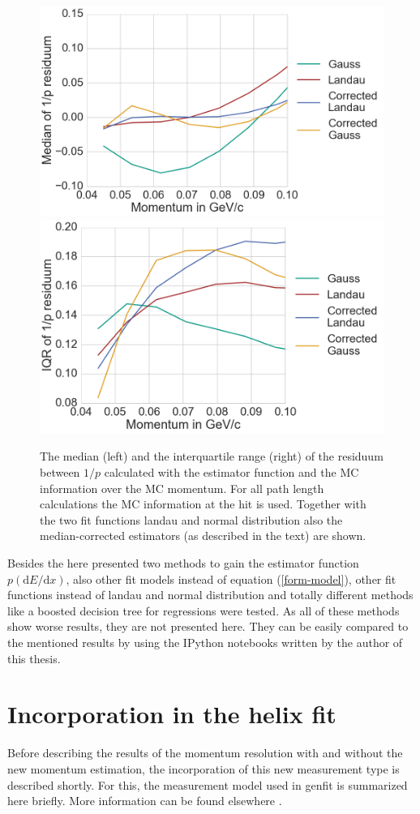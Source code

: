 \begin{figure}
  \centering
   \includegraphics[width=0.47\linewidth]{figures/vxd/divPMedian.png}
   \includegraphics[width=0.47\linewidth]{figures/vxd/divPIQR.png}
  \caption[Median and IQR of $1/p$.]{The median (left) and the interquartile range (right) of the residuum between $1/p$ calculated with the estimator function and the MC information over the MC momentum. For all path length calculations the MC information at the hit is used. Together with the two fit functions landau and normal distribution also the median-corrected estimators (as described in the text) are shown.}
  \label{fig-divp-residuum}
\end{figure}


Besides the here presented two methods to gain the estimator function $p(\mathrm dE/\mathrm dx)$, also other fit models instead of equation (\ref{form-model}), other fit functions instead of landau and normal distribution and totally different methods like a boosted decision tree for regressions were tested. As all of these methods show worse results, they are not presented here. They can be easily compared to the mentioned results by using the IPython notebooks written by the author of this thesis.

\section{Incorporation in the helix fit}

Before describing the results of the momentum resolution with and without the new momentum estimation, the incorporation of this new measurement type is described shortly. For this, the measurement model used in genfit is summarized here briefly. More information can be found elsewhere \cite{genfit}.

